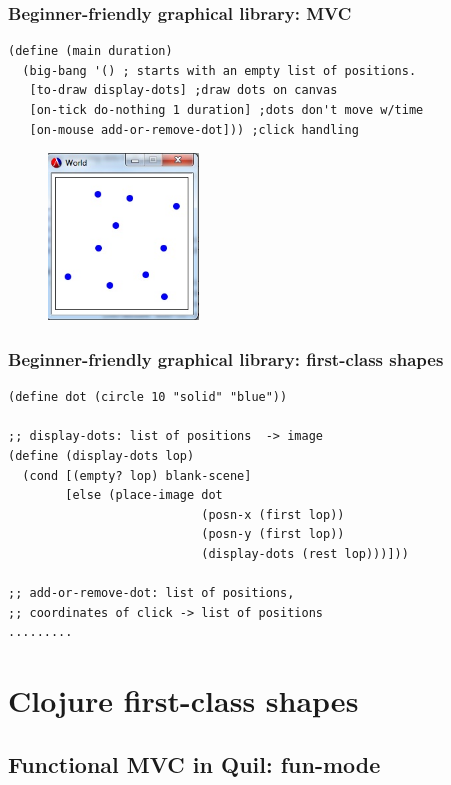\documentclass{beamer}
\begin{document}
\begin{frame}[fragile]
\frametitle{Beginner-friendly graphical library: MVC}
\begin{verbatim}
(define (main duration)
  (big-bang '() ; starts with an empty list of positions.
   [to-draw display-dots] ;draw dots on canvas
   [on-tick do-nothing 1 duration] ;dots don't move w/time
   [on-mouse add-or-remove-dot])) ;click handling
\end{verbatim}
\begin{figure}[h]
\includegraphics[width=4cm]{PresentationImages/dots.jpg}
\end{figure}
\end{frame}

\begin{frame}[fragile]
\frametitle{Beginner-friendly graphical library: first-class shapes}
\begin{verbatim}
(define dot (circle 10 "solid" "blue"))

;; display-dots: list of positions  -> image
(define (display-dots lop)     
  (cond [(empty? lop) blank-scene]
        [else (place-image dot
                           (posn-x (first lop))
                           (posn-y (first lop))
                           (display-dots (rest lop)))]))

;; add-or-remove-dot: list of positions, 
;; coordinates of click -> list of positions
.........
\end{verbatim}

\end{frame}

\section{Clojure first-class shapes}

\subsection{Functional MVC in Quil: fun-mode}
\end{document}
